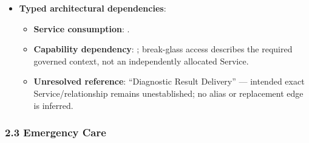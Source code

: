 \begin{itemize}
\begin{itemize}
\begin{itemize}
\item 
\emph{Exposed Service}: \texttt{} — Dispatches urgent interruptive alerts to on-duty ward teams.



\end{itemize}


\end{itemize}


\item 
\textbf{Typed architectural dependencies}:


\begin{itemize}

\item 
\textbf{Service consumption}: \texttt{}.



\item 
\textbf{Capability dependency}: \texttt{}; break-glass access describes the required governed context, not an independently allocated Service.



\item 
\textbf{Unresolved reference}: “Diagnostic Result Delivery” — intended exact Service/\allowbreak{}relationship remains unestablished; no alias or replacement edge is inferred.



\end{itemize}


\end{itemize}
\label{rad:sd:86}

\par\smallskip
{}\label{rad:sd:88}



\label{rad:sd:90}
\subsubsection*{2.3 Emergency Care}
\label{rad:sd:91}

